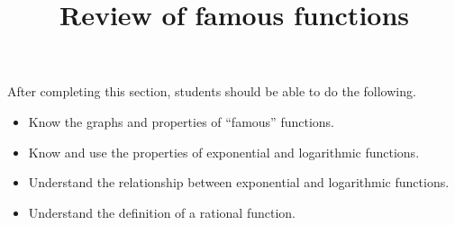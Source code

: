 \documentclass{ximera}
\title{Review of famous functions}
\begin{document}
\begin{abstract} 
\end{abstract}

\maketitle

\begin{sectionOutcomes}
After completing this section, students should be able to do the following.

\begin{itemize}
	\item Know the graphs and properties of ``famous'' functions.
	\item Know and use the properties of exponential and logarithmic functions.
	\item Understand the relationship between exponential and logarithmic functions.
        \item Understand the definition of a rational function.
\end{itemize}
\end{sectionOutcomes}
\end{document}
